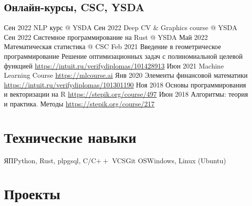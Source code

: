 \documentclass[11pt,a4paper]{moderncv}
\begin{document}
	\subsection{Онлайн-курсы, CSC, YSDA}
	\cventry
	{Сен 2022}
	{NLP курс @ YSDA}
	{}
	{}{}{}
	\cventry
	{Сен 2022}
	{Deep CV \& Graphics course @ YSDA}
	{}
	{}{}{}
	\cventry
	{Сен 2022}
	{Системное программирование на Rust @ YSDA}
	{}
	{}{}{}
	\cventry
	{Май 2022}
	{Математическая статистика @ CSC}
	{}
	{}{}{}
	\cventry
	{Feb 2021}
	{Введение в геометрическое программирование}
	{\newline Решение оптимизационных задач с полиномиальной целевой функцией}
	{}{\newline\url{https://intuit.ru/verifydiplomas/101428913}}{}
	\cventry
	{Июн 2021}
	{Machine Learning Course}
	{}
	{}{\newline\url{https://mlcourse.ai}}{}
	\cventry
	{Янв 2020}
	{Элементы финансовой математики}
	{}
	{}{\newline\url{https://intuit.ru/verifydiplomas/101301190}}{}
	\cventry
	{Ноя 2018}
	{Основы программирования и векторизации на R}
	{}
	{}{\newline\url{https://stepik.org/course/497}}{}
	\cventry
	{Июн 2018}
	{Алгоритмы: теория и практика. Методы}
	{}
	{}{\newline\url{https://stepik.org/course/217}}{}
	
	\pagebreak
	\section{Технические навыки}
	\cvline
	{ЯП}{Python, Rust, plpgsql, C/C$++$}
	\cvline
	{VCS}{Git}
	\cvline
	{OS}{Windows, Linux (Ubuntu)}
	\section{Проекты}
\end{document}
